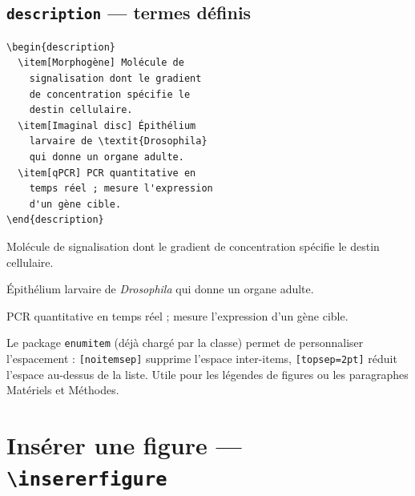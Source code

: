 \documentclass[12pt, a4paper]{article}
\begin{document}
\newpage

\subsection{\texttt{description} — termes définis}

\begin{demo}
\begin{lstlisting}[style=latexcode]
\begin{description}
  \item[Morphogène] Molécule de
    signalisation dont le gradient
    de concentration spécifie le
    destin cellulaire.
  \item[Imaginal disc] Épithélium
    larvaire de \textit{Drosophila}
    qui donne un organe adulte.
  \item[qPCR] PCR quantitative en
    temps réel ; mesure l'expression
    d'un gène cible.
\end{description}
\end{lstlisting}
\tcblower
\begin{description}[noitemsep, topsep=2pt, leftmargin=1.5em]
  \item[\textbf{Morphogène}] Molécule de signalisation dont le gradient de concentration spécifie le destin cellulaire.
  \item[\textbf{Imaginal disc}] Épithélium larvaire de \textit{Drosophila} qui donne un organe adulte.
  \item[\textbf{qPCR}] PCR quantitative en temps réel ; mesure l'expression d'un gène cible.
\end{description}
\end{demo}

\begin{astuce}
  Le package \texttt{enumitem} (déjà chargé par la classe) permet de personnaliser l'espacement :
  \texttt{[noitemsep]} supprime l'espace inter-items, \texttt{[topsep=2pt]} réduit l'espace au-dessus de la liste.
  Utile pour les légendes de figures ou les paragraphes Matériels et Méthodes.
\end{astuce}

\section{Insérer une figure — \texttt{\textbackslash insererfigure}}
\end{document}

